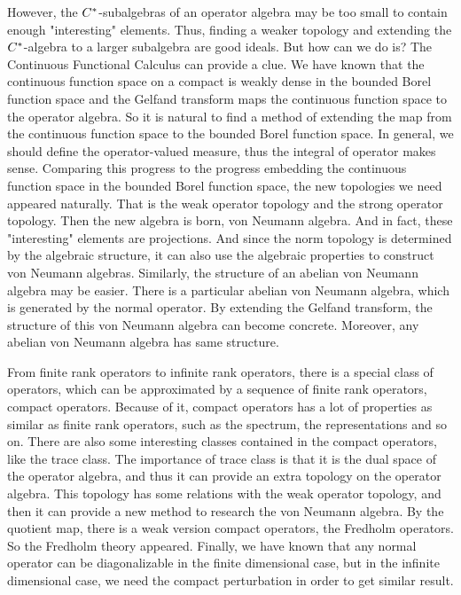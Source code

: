 \documentclass[a4paper,11pt]{report}
\begin{document}
However, the $C^{*}$-subalgebras of an operator algebra may be too small to contain enough "interesting" elements. Thus, finding a weaker topology and extending the $C^{*}$-algebra to a larger subalgebra are good ideals. But how can we do is? The Continuous Functional Calculus can provide a clue. We have known that the continuous function space on a compact is weakly dense in the bounded Borel function space and the Gelfand transform maps the continuous function space to the operator algebra. So it is natural to find a method of extending the map from the continuous function space to the bounded Borel function space. In general, we should define the operator-valued measure, thus the integral of operator makes sense. Comparing this progress to the progress embedding the continuous function space in the bounded Borel function space, the new topologies we need appeared naturally. That is the weak operator topology and the strong operator topology. Then the new algebra is born, von Neumann algebra. And in fact, these "interesting" elements are projections. And since the norm topology is determined by the algebraic structure, it can also use the algebraic properties to construct von Neumann algebras. Similarly, the structure of an abelian von Neumann algebra may be easier. There is a particular abelian von Neumann algebra, which is generated by the normal operator. By extending the Gelfand transform, the structure of this von Neumann algebra can become concrete. Moreover, any abelian von Neumann algebra has same structure.

From finite rank operators to infinite rank operators, there is a special class of operators, which can be approximated by a sequence of finite rank operators, compact operators. Because of it, compact operators has a lot of properties as similar as finite rank operators, such as the spectrum, the representations and so on. There are also some interesting classes contained in the compact operators, like the trace class. The importance of trace class is that it is the dual space of the operator algebra, and thus it can provide an extra topology on the operator algebra. This topology has some relations with the weak operator topology, and then it can provide a new method to research the von Neumann algebra. By the quotient map, there is a weak version compact operators, the Fredholm operators. So the Fredholm theory appeared. Finally, we have known that any normal operator can be diagonalizable in the finite dimensional case, but in the infinite dimensional case, we need the compact perturbation in order to get similar result. 
\end{document}
